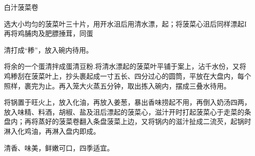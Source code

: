 \begin{recipe}{白汁菠菜卷}

\ingredients


\cooking

\step 选大小均匀的菠菜叶三十片，用开水沮后用清水漂，起；将菠菜心沮后同样漂起I再将鸡脯肉及肥膘捶茸，同蛋

清打成“糁”，放入碗内待用。

\step 将余的一个蛋清拌成蛋清豆粉.将清水漂起的菠菜叶平铺于案上，沾千水份，又将鸡糁刮在菠菜叶上，抄头裹起成一寸五长、四分过心的圆筒，平放在大盘内，每个照样，裹完为止。再入笼大火蒸五分钟，取出拣入碗内，摆成三叠水待用。

\step 将锅置于旺火上，放入化油，再放入姜葱，暴出香味捞起不用，再倒入奶汤四两，放入味精、料酒，胡椒、盐及沮后漂起的菠菜心，滋汁开时打起菠菜心于走菜的条盘内；再将蒸好的菠菜卷翻入条盘菠菜上边，又将锅内的滋汁扯成二流芡，起锅时淋入化鸡油，再淋入盘内即成。

\notes

清香、味美，鲜嫩可口，四季适宜。

\end{recipe}

